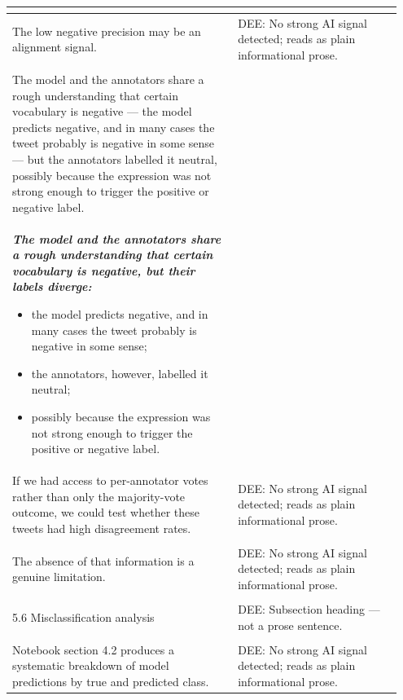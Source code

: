 \documentclass[11pt]{article}
\begin{document}
\begin{longtable}{|p{0.55\linewidth}|p{0.40\linewidth}|}
{\begin{itemize}[leftmargin=*,topsep=2pt,itemsep=1pt,parsep=0pt]
\end{itemize}}\vspace{2em} & \\
\hline
The low negative precision may be an alignment signal. & DEE: No strong AI signal detected; reads as plain informational prose. \\[2pt]
\hline
\rule{0pt}{3.5cm} & \\
\hline
The model and the annotators share a rough understanding that certain vocabulary is negative --- the model predicts negative, and in many cases the tweet probably is negative in some sense --- but the annotators labelled it neutral, possibly because the expression was not strong enough to trigger the positive or negative label. & \\[2pt]
\hline
{\bfseries\itshape The model and the annotators share a rough understanding that certain vocabulary is negative, but their labels diverge:
\begin{itemize}[leftmargin=*,topsep=2pt,itemsep=1pt,parsep=0pt]
  \item the model predicts negative, and in many cases the tweet probably is negative in some sense;
  \item the annotators, however, labelled it neutral;
  \item possibly because the expression was not strong enough to trigger the positive or negative label.
\end{itemize}}\vspace{2em} & \\
\hline
If we had access to per-annotator votes rather than only the majority-vote outcome, we could test whether these tweets had high disagreement rates. & DEE: No strong AI signal detected; reads as plain informational prose. \\[2pt]
\hline
\rule{0pt}{3.5cm} & \\
\hline
The absence of that information is a genuine limitation. & DEE: No strong AI signal detected; reads as plain informational prose. \\[2pt]
\hline
\rule{0pt}{3.5cm} & \\
\hline
5.6 Misclassification analysis & DEE: Subsection heading --- not a prose sentence. \\[2pt]
\hline
\rule{0pt}{3.5cm} & \\
\hline
Notebook section 4.2 produces a systematic breakdown of model predictions by true and predicted class. & DEE: No strong AI signal detected; reads as plain informational prose. \\[2pt]

\end{longtable}
\end{document}
